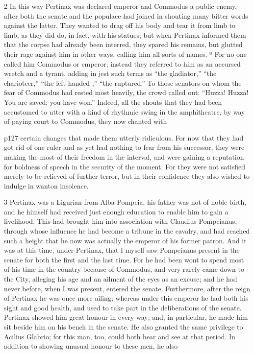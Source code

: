 2
In this way Pertinax was declared emperor and Commodus a public enemy, after both the senate and the populace had joined in shouting many bitter words against the latter. They wanted to drag off his body and tear it from limb to limb, as they did do, in fact, with his statues; but when Pertinax informed them that the corpse had already been interred, they spared his remains, but glutted their rage against him in other ways, calling him all sorts of names. º For no one called him Commodus or emperor; instead they referred to him as an accursed wretch and a tyrant, adding in jest such terms as ``the gladiator,'' ``the charioteer,'' ``the left-handed ,'' ``the ruptured.'' To those senators on whom the fear of Commodus had rested most heavily, the crowd called out: ``Huzza! Huzza! You are saved; you have won.'' Indeed, all the shouts that they had been accustomed to utter with a kind of rhythmic swing in the amphitheatre, by way of paying court to Commodus, they now chanted with

p127 certain changes that made them utterly ridiculous. For now that they had got rid of one ruler and as yet had nothing to fear from his successor, they were making the most of their freedom in the interval, and were gaining a reputation for boldness of speech in the security of the moment. For they were not satisfied merely to be relieved of further terror, but in their confidence they also wished to indulge in wanton insolence.

3
Pertinax was a Ligurian from Alba Pompeia; his father was not of noble birth, and he himself had received just enough education to enable him to gain a livelihood. This had brought him into association with Claudius Pompeianus, through whose influence he had become a tribune in the cavalry, and had reached such a height that he now was actually the emperor of his former patron. And it was at this time, under Pertinax, that I myself saw Pompeianus present in the senate for both the first and the last time. For he had been wont to spend most of his time in the country because of Commodus, and very rarely came down to the City, alleging his age and an ailment of the eyes as an excuse; and he had never before, when I was present, entered the senate. Furthermore, after the reign of Pertinax he was once more ailing; whereas under this emperor he had both his sight and good health, and used to take part in the deliberations of the senate. Pertinax showed him great honour in every way; and, in particular, he made him sit beside him on his bench in the senate. He also granted the same privilege to Acilius Glabrio; for this man, too, could both hear and see at that period. In addition to showing unusual honour to these men, he also

